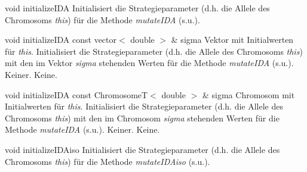 \documentclass{report}
\begin{document}
\vspace{4ex}

\setNormalInstance
\setCorrectWidthThree{8pt}
\printMethodWithParamsSaved
{void}
{}
{initializeIDA}
{Initialisiert die Strategieparameter (d.h. die Allele des Chromosoms
 {\em this}) f\"ur die Methode {\em mutateIDA} (s.u.).}
{}
\setCorrectWidthThree{4pt}

\newpage

\setNormalInstance
\printMethodWithOneParam
{void}
{initializeIDA}
{const vector$<$ double $>$ \&}
{sigma}
{Vektor mit Initialwerten f\"ur {\em this}.}
{Initialisiert die Strategieparameter (d.h. die Allele des Chromosoms
 {\em this}) mit den im Vektor {\em sigma} stehenden Werten f\"ur
 die Methode {\em mutateIDA} (s.u.).}
{Keiner.}
{Keine.}

\vspace{4ex}

\setNormalInstance
\printMethodWithOneParam
{void}
{initializeIDA}
{const ChromosomeT$<$ double $>$ \&}
{sigma}
{Chromosom mit Initialwerten f\"ur {\em this}.}
{Initialisiert die Strategieparameter (d.h. die Allele des Chromosoms
 {\em this}) mit den im Chromosom {\em sigma} stehenden Werten f\"ur
 die Methode {\em mutateIDA} (s.u.).}
{Keiner.}
{Keine.}

\vspace{4ex}

\setNormalInstance
\setCorrectWidthThree{8pt}
\printMethodWithParamsSaved
{void}
{}
{initializeIDAiso}
{Initialisiert die Strategieparameter (d.h. die Allele des Chromosoms
 {\em this}) f\"ur die Methode {\em mutateIDAiso} (s.u.).}
{}
\setCorrectWidthThree{4pt}
\end{document}

